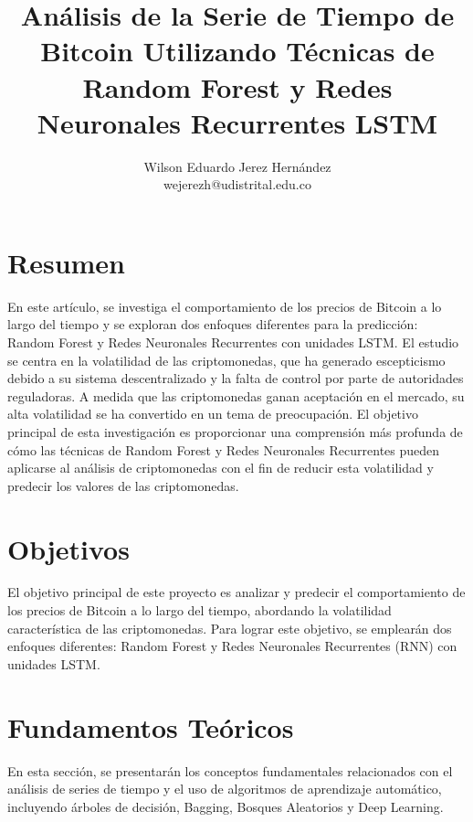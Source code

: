 \documentclass[final, 20pt, a2paper, portrait]{extarticle}
\title{Análisis de la Serie de Tiempo de Bitcoin Utilizando Técnicas de Random Forest y Redes Neuronales Recurrentes LSTM}
\author{Wilson Eduardo Jerez Hernández\\wejerezh@udistrital.edu.co}
\date{}
\begin{document}
\section*{}
\vspace{2cm}
\section*{Resumen}
En este artículo, se investiga el comportamiento de los precios de Bitcoin a lo largo del tiempo y se exploran dos enfoques diferentes para la predicción: Random Forest y Redes Neuronales Recurrentes con unidades LSTM. El estudio se centra en la volatilidad de las criptomonedas, que ha generado escepticismo debido a su sistema descentralizado y la falta de control por parte de autoridades reguladoras. A medida que las criptomonedas ganan aceptación en el mercado, su alta volatilidad se ha convertido en un tema de preocupación. El objetivo principal de esta investigación es proporcionar una comprensión más profunda de cómo las técnicas de Random Forest y Redes Neuronales Recurrentes pueden aplicarse al análisis de criptomonedas con el fin de reducir esta volatilidad y predecir los valores de las criptomonedas.

\section*{Objetivos}
El objetivo principal de este proyecto es analizar y predecir el comportamiento de los precios de Bitcoin a lo largo del tiempo, abordando la volatilidad característica de las criptomonedas. Para lograr este objetivo, se emplearán dos enfoques diferentes: Random Forest y Redes Neuronales Recurrentes (RNN) con unidades LSTM.

\section*{Fundamentos Teóricos}
En esta sección, se presentarán los conceptos fundamentales relacionados con el análisis de series de tiempo y el uso de algoritmos de aprendizaje automático, incluyendo árboles de decisión, Bagging, Bosques Aleatorios y Deep Learning.
\end{document}
